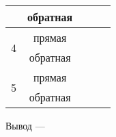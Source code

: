 \begin{table}[h]
\begin{tabular}{|c|c|c|c|c|}
                                                                      & обратная   &                                                                     &                                                                      &                                                                       \\ \hline
\multirow{2}{*}{4}                                                    & прямая     &                                                                     &                                                                      &                                                                       \\ \cline{2-5} 
                                                                      & обратная   &                                                                     &                                                                      &                                                                       \\ \hline
\multirow{2}{*}{5}                                                    & прямая     & \multicolumn{1}{l|}{}                                               & \multicolumn{1}{l|}{}                                                & \multicolumn{1}{l|}{}                                                 \\ \cline{2-5} 
                                                                      & обратная   & \multicolumn{1}{l|}{}                                               & \multicolumn{1}{l|}{}                                                & \multicolumn{1}{l|}{}                                                 \\ \hline
\end{tabular}
\end{table}

Вывод --- \hrulefill

\hrulefill

\hrulefill

